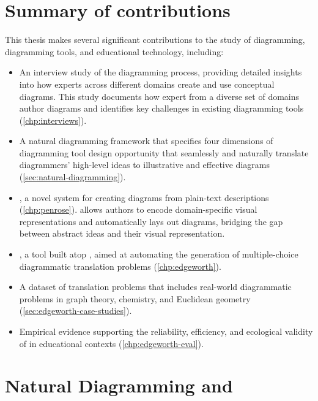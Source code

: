 \section{Summary of contributions}

This thesis makes several significant contributions to the study of diagramming, diagramming tools, and educational technology, including:

\begin{itemize}

    \item An interview study of the diagramming process, providing detailed insights into how experts across different domains create and use conceptual diagrams. This study documents how expert from a diverse set of domains author diagrams and identifies key challenges in existing diagramming tools (\cref{chp:interviews}).

    \item A natural diagramming framework that specifies four dimensions of diagramming tool design opportunity that seamlessly and naturally translate diagrammers’ high-level ideas to illustrative and effective diagrams (\cref{sec:natural-diagramming}).
    
    \item \Penrose, a novel system for creating diagrams from plain-text descriptions (\cref{chp:penrose}). \Penrose allows authors to encode domain-specific visual representations and automatically lays out diagrams, bridging the gap between abstract ideas and their visual representation.
    
    \item \Edgeworth, a tool built atop \Penrose, aimed at automating the generation of multiple-choice diagrammatic translation problems (\cref{chp:edgeworth}). 
    
    \item A dataset of translation problems that includes real-world diagrammatic problems in graph theory, chemistry, and Euclidean geometry (\cref{sec:edgeworth-case-studies}).
    
    \item Empirical evidence supporting the reliability, efficiency, and ecological validity of \Edgeworth in educational contexts (\cref{chp:edgeworth-eval}). 
    
\end{itemize}

\section{Natural Diagramming and \Penrose}

